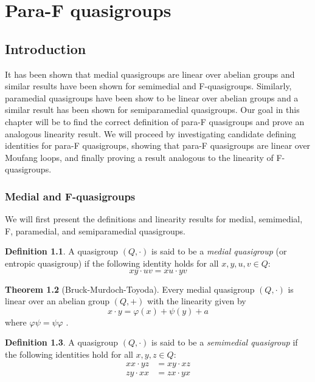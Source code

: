 \documentclass[12pt]{report}
\theoremstyle{definition}
\newtheorem{thm}{Theorem}[chapter]
\newtheorem{dfn}[thm]{Definition}
\begin{document}

\chapter{Para-F quasigroups}

\section{Introduction}\label{para-f-intro}

It has been shown that medial quasigroups are linear over abelian groups and similar results have
  been shown for semimedial and F-quasigroups. Similarly, paramedial quasigroups have been show
  to be linear over abelian groups and a similar result has been shown for semiparamedial
  quasigroups. Our goal in this chapter will be to find the correct definition of para-F quasigroups
  and prove an analogous linearity result. We will proceed by investigating candidate defining
  identities for para-F quasigroups, showing that para-F quasigroups are linear over Moufang loops,
  and finally proving a result analogous to the linearity of F-quasigroups.

\subsection{Medial and F-quasigroups}

We will first present the definitions and linearity results for medial, semimedial, F,
  paramedial, and semiparamedial quasigroups.

\begin{dfn}
  A quasigroup $(Q, \cdot)$ is said to be a \emph{medial quasigroup} (or entropic quasigroup)
    if the following identity holds for all $x, y, u, v\in Q$:
  \[xy\cdot uv = xu\cdot yv\]
\end{dfn}

\begin{thm}[Bruck-Murdoch-Toyoda]
  Every medial quasigroup $(Q, \cdot)$ is linear over an abelian group $(Q, +)$ with the linearity
    given by
  \[x\cdot y = \varphi(x) + \psi(y) + a\]
  where $\varphi\psi = \psi\varphi$ \cite{SP}.
\end{thm}

\begin{dfn}
  A quasigroup $(Q, \cdot)$ is said to be a \emph{semimedial quasigroup} if the following identities
    hold for all $x, y, z\in Q$:
  \begin{align*}
    xx\cdot yz &= xy\cdot xz\\
    zy\cdot xx &= zx\cdot yx
  \end{align*}
\end{dfn}
\end{document}
